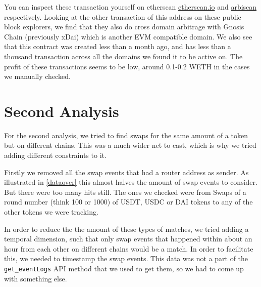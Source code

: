 You can inspect these transaction yourself on etherscan \href{https://etherscan.io/tx/0x609a6c5d7d1a266a06178cf9da546822d1d4c83ab4309c83e03719985e6b792c}{etherscan.io} and \href{https://arbiscan.io/tx/0x9d7d87f32df33202530d988edc879ba755de0e011e0394583577fe2f0be57ff3}{arbiscan} respectively. 
Looking at the other transaction of this address on these public block explorers, we find that they also do cross domain arbitrage with Gnosis Chain (previously xDai) which is another EVM compatible domain. 
We also see that this contract was created less than a month ago, and has less than a thousand transaction across all the domains we found it to be active on. The profit of these transactions seems to be low, around 0.1-0.2 WETH in the cases we manually checked. 

\section{Second Analysis}
For the second analysis, we tried to find swaps for the same amount of a token but on different chains. This was a much wider net to cast, which is why we tried adding different constraints to it.

Firstly we removed all the swap events that had a router address as sender. As illustrated in \ref{dataover} this almost halves the amount of swap events to consider. But there were too many hits still. The ones we checked were from Swaps of a round number (think 100 or 1000) of USDT, USDC or DAI tokens to any of the other tokens we were tracking. 

In order to reduce the the amount of these types of matches, we tried adding a temporal dimension, such that only swap events that happened within about an hour from each other on different chains would be a match. In order to facilitate this, we needed to timestamp the swap events. This data was not a part of the \texttt{get\_eventLogs} API method that we used to get them, so we had to come up with something else.

